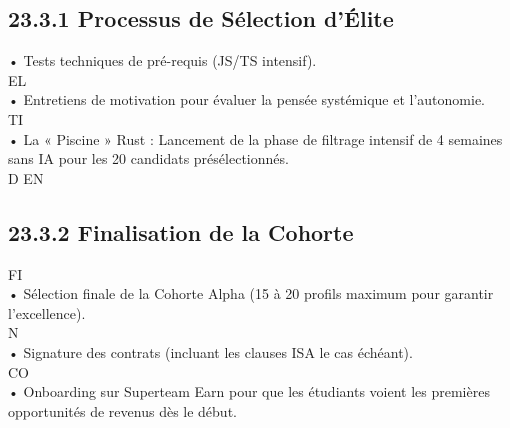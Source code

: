 \documentclass[12pt,landscape,a4paper]{article}
\begin{document}
\subsection{23.3.1 Processus de Sélection d’Élite}
• Tests techniques de pré-requis (JS/TS intensif).\\
\vspace{0.5em}
\vspace{0.5em}
\vspace{0.5em}
\vspace{0.5em}
EL\\
• Entretiens de motivation pour évaluer la pensée systémique et l’autonomie.\\
\vspace{0.5em}
\vspace{0.5em}
\vspace{0.5em}
\vspace{0.5em}
TI\\
• La « Piscine » Rust : Lancement de la phase de filtrage intensif de 4 semaines sans IA pour les 20 candidats présélectionnés.\\
\vspace{0.5em}
\vspace{0.5em}
\vspace{0.5em}
\vspace{0.5em}
D   EN\\
\subsection{23.3.2 Finalisation de la Cohorte}
\vspace{0.5em}
\vspace{0.5em}
\vspace{0.5em}
\vspace{0.5em}
FI\\
• Sélection finale de la Cohorte Alpha (15 à 20 profils maximum pour garantir l’excellence).\\
\vspace{0.5em}
N\\
• Signature des contrats (incluant les clauses ISA le cas échéant).\\
CO\\
• Onboarding sur Superteam Earn pour que les étudiants voient les premières opportunités de revenus dès le début.\\
\vspace{0.5em}
\vspace{0.5em}
\end{document}
